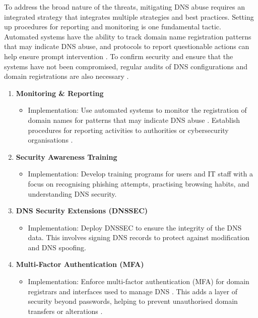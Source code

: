 To address the broad nature of the threats, mitigating DNS abuse requires an integrated strategy that integrates multiple strategies and best practices. Setting up procedures for reporting and monitoring is one fundamental tactic. Automated systems have the ability to track domain name registration patterns that may indicate DNS abuse, and protocols to report questionable actions can help ensure prompt intervention \cite{icannndnssec}. To confirm security and ensure that the systems have not been compromised, regular audits of DNS configurations and domain registrations are also necessary \cite{lucas2021tls} .

\begin{enumerate}
    \item \textbf{Monitoring \& Reporting}
    \begin{itemize}
        \item Implementation: Use automated systems to monitor the registration of domain names for patterns that may indicate DNS abuse \cite{icannndnssec}. Establish procedures for reporting activities to authorities or cybersecurity organisations \cite{lucas2021tls}.
    \end{itemize}
    \item \textbf{Security Awareness Training}
    \begin{itemize}
        \item Implementation: Develop training programs for users and IT staff with a focus on recognising phishing attempts, practising browsing habits, and understanding DNS security.
    \end{itemize}
    \item \textbf{DNS Security Extensions (DNSSEC)}
    \begin{itemize}
        \item Implementation: Deploy DNSSEC to ensure the integrity of the DNS data. This involves signing DNS records to protect against modification and DNS spoofing.
    \end{itemize}
    \item \textbf{Multi-Factor Authentication (MFA)}
    \begin{itemize}
        \item Implementation: Enforce multi-factor authentication (MFA) for domain registrars and interfaces used to manage DNS \cite{icannndnssec}. This adds a layer of security beyond passwords, helping to prevent unauthorised domain transfers or alterations \cite{moghaddam2014ecco}.
    \end{itemize}

\end{enumerate}
